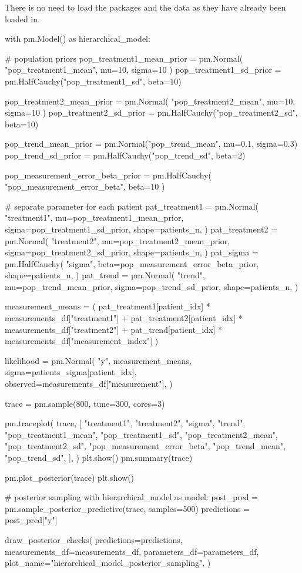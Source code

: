 \documentclass[12pt,a4paper,leqno]{report}
\theoremstyle{plain}
\theoremstyle{definition}
\theoremstyle{remark}
\begin{document}
There is no need to load the packages and the data as they have already been loaded in.


\bigskip
\begin{pyverbatim}
with pm.Model() as hierarchical_model:

    # population priors
    pop_treatment1_mean_prior = pm.Normal(
        "pop_treatment1_mean", mu=10, sigma=10
    )
    pop_treatment1_sd_prior = pm.HalfCauchy("pop_treatment1_sd", beta=10)

    pop_treatment2_mean_prior = pm.Normal(
        "pop_treatment2_mean", mu=10, sigma=10
    )
    pop_treatment2_sd_prior = pm.HalfCauchy("pop_treatment2_sd", beta=10)

    pop_trend_mean_prior = pm.Normal("pop_trend_mean", mu=0.1, sigma=0.3)
    pop_trend_sd_prior = pm.HalfCauchy("pop_trend_sd", beta=2)

    pop_measurement_error_beta_prior = pm.HalfCauchy(
        "pop_measurement_error_beta", beta=10
    )

    # separate parameter for each patient
    pat_treatment1 = pm.Normal(
        "treatment1",
        mu=pop_treatment1_mean_prior,
        sigma=pop_treatment1_sd_prior,
        shape=patients_n,
    )
    pat_treatment2 = pm.Normal(
        "treatment2",
        mu=pop_treatment2_mean_prior,
        sigma=pop_treatment2_sd_prior,
        shape=patients_n,
    )
    pat_sigma = pm.HalfCauchy(
        "sigma", beta=pop_measurement_error_beta_prior, shape=patients_n,
    )
    pat_trend = pm.Normal(
        "trend",
        mu=pop_trend_mean_prior,
        sigma=pop_trend_sd_prior,
        shape=patients_n,
    )

    measurement_means = (
        pat_treatment1[patient_idx] * measurements_df["treatment1"]
        + pat_treatment2[patient_idx] * measurements_df["treatment2"]
        + pat_trend[patient_idx] * measurements_df["measurement_index"]
    )

    likelihood = pm.Normal(
        "y",
        measurement_means,
        sigma=patients_sigma[patient_idx],
        observed=measurements_df["measurement"],
    )

    trace = pm.sample(800, tune=300, cores=3)

    pm.traceplot(
        trace,
        [
            "treatment1",
            "treatment2",
            "sigma",
            "trend",
            "pop_treatment1_mean",
            "pop_treatment1_sd",
            "pop_treatment2_mean",
            "pop_treatment2_sd",
            "pop_measurement_error_beta",
            "pop_trend_mean",
            "pop_trend_sd",
        ],
    )
    plt.show()
    pm.summary(trace)

    pm.plot_posterior(trace)
    plt.show()


# posterior sampling
with hierarchical_model as model:
    post_pred = pm.sample_posterior_predictive(trace, samples=500)
    predictions = post_pred["y"]

draw_posterior_checks(
    predictions=predictions,
    measurements_df=measurements_df,
    parameters_df=parameters_df,
    plot_name="hierarchical_model_posterior_sampling",
)
\end{pyverbatim}
\end{document}
